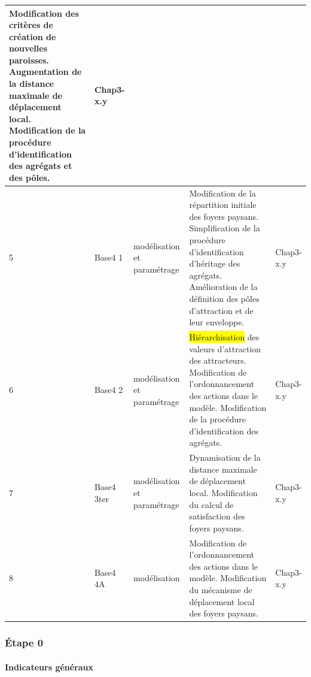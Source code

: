 \documentclass[12pt, a4paper, oneside]{book}
\begin{document}
\begin{footnotesize}
\begin{longtable}{ m{} m{}  m{}  m{}  m{}  }
			Modification des critères de création de nouvelles paroisses. \newline
			Augmentation de la distance maximale de déplacement local. \newline
			Modification de la procédure d'identification des agrégats et des pôles. & Chap3-x.y\\
			\hline
			5 & Base4 1 & modélisation et paramétrage & 
			Modification de la répartition initiale des foyers paysans.\newline
			Simplification de la procédure d'identification d'héritage des agrégats.
			Amélioration de la définition des pôles d'attraction et de leur enveloppe. & Chap3-x.y\\
			\hline
			6 & Base4 2 & modélisation et paramétrage & \colorbox{yellow}{Hiérarchisation} des valeurs d'attraction des attracteurs. \newline
			Modification de l'ordonnancement des actions dans le modèle.\newline
			Modification de la procédure d'identification des agrégats. & Chap3-x.y\\
			\hline
			7 & Base4 3ter & modélisation et paramétrage &
			Dynamisation de la distance maximale de déplacement local.\newline
			Modification du calcul de satisfaction des foyers paysans. & Chap3-x.y\\
			\hline
			8 & Base4 4A & modélisation & Modification de l'ordonnancement des actions dans le modèle.\newline
			Modification du mécanisme de déplacement local des foyers paysans. & Chap3-x.y\\
			\hline
			
		\end{longtable}
	\end{footnotesize}

	\subsubsection{Étape 0}
	
	\paragraph{Indicateurs généraux}
	
\end{document}
